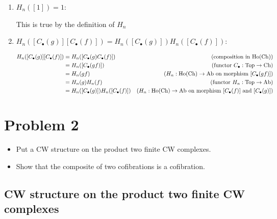 \documentclass{article}
\begin{document}
\begin{longproof}

\begin{enumerate}
    \item $H_n([1]) = 1$:

    This is true by the definition of $H_n$
    
    \item $H_n([C_\bullet(g)][C_\bullet(f)]) = H_n([C_\bullet(g)]) H_n([C_\bullet(f)])$:

    \begin{align*}
        H_n([C_\bullet(g)][C_\bullet(f)])
        &= H_n([C_\bullet(g) C_\bullet(f)]) &\text{(composition in $\operatorname{Ho}(\operatorname{Ch})$)} \\
        &= H_n([C_\bullet(gf)]) &\text{(functor $C_\bullet: \operatorname{Top} \to \operatorname{Ch}$)} \\
        &= H_n(gf) &\text{($H_n: \operatorname{Ho}(\operatorname{Ch}) \to \operatorname{Ab}$ on morphism $[C_\bullet(gf)]$)} \\
        &= H_n(g) H_n(f) &\text{(functor $H_n: \operatorname{Top} \to \operatorname{Ab}$)} \\
        &= H_n([C_\bullet(g)]) H_n([C_\bullet(f)]) &\text{($H_n: \operatorname{Ho}(\operatorname{Ch}) \to \operatorname{Ab}$ on morphism $[C_\bullet(f)]$ and $[C_\bullet(g)]$)}
    \end{align*}
\end{enumerate}
\end{longproof}











\section{Problem 2}
\begin{itemize}
    \item Put a CW structure on the product two finite CW complexes.
    \item Show that the composite of two cofibrations is a cofibration.
\end{itemize}

\subsection{CW structure on the product two finite CW complexes}
\end{document}
